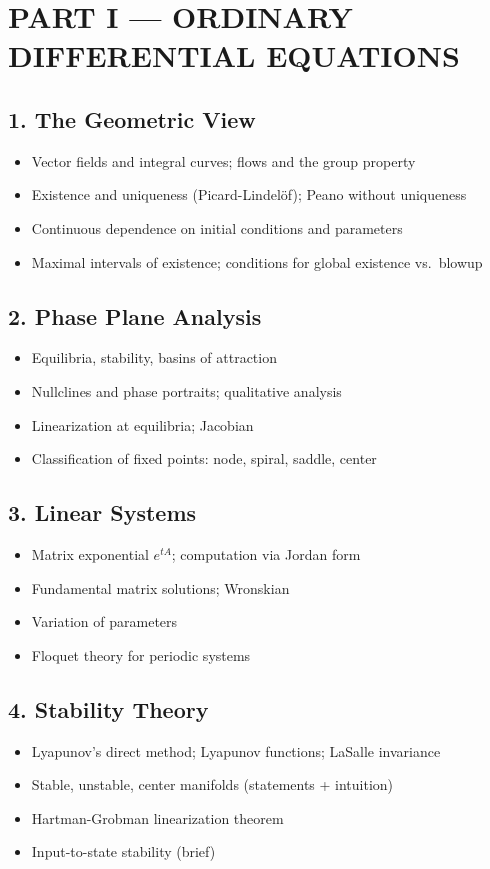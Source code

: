 \section{PART I --- ORDINARY DIFFERENTIAL EQUATIONS}

\subsection{1. The Geometric View}
\begin{itemize}
\item Vector fields and integral curves; flows and the group property
\item Existence and uniqueness (Picard-Lindel\"of); Peano without uniqueness
\item Continuous dependence on initial conditions and parameters
\item Maximal intervals of existence; conditions for global existence vs.\ blowup
\end{itemize}

\subsection{2. Phase Plane Analysis}
\begin{itemize}
\item Equilibria, stability, basins of attraction
\item Nullclines and phase portraits; qualitative analysis
\item Linearization at equilibria; Jacobian
\item Classification of fixed points: node, spiral, saddle, center
\end{itemize}

\subsection{3. Linear Systems}
\begin{itemize}
\item Matrix exponential $e^{tA}$; computation via Jordan form
\item Fundamental matrix solutions; Wronskian
\item Variation of parameters
\item Floquet theory for periodic systems
\end{itemize}

\subsection{4. Stability Theory}
\begin{itemize}
\item Lyapunov's direct method; Lyapunov functions; LaSalle invariance
\item Stable, unstable, center manifolds (statements + intuition)
\item Hartman-Grobman linearization theorem
\item Input-to-state stability (brief)
\end{itemize}

